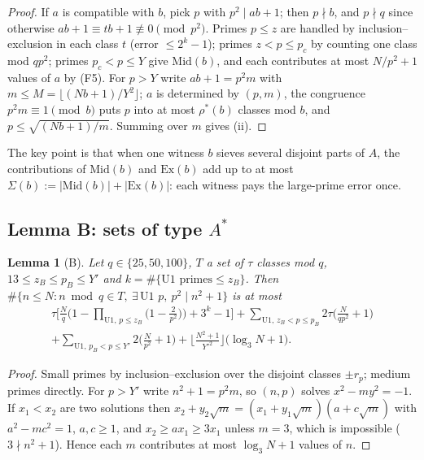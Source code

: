 \documentclass[11pt]{amsart}
\newtheorem{lemma}[theorem]{Lemma}
\theoremstyle{definition}
\theoremstyle{remark}
\newcommand{\Mid}{\mathrm{Mid}}
\newcommand{\Ex}{\mathrm{Ex}}
\begin{document}
\begin{proof}
If $a$ is compatible with $b$, pick $p$ with $p^2\mid ab+1$; then $p\nmid b$, and
$p\nmid q$ since otherwise $ab+1\equiv tb+1\not\equiv0\pmod{p^2}$. Primes $p\le z$
are handled by inclusion--exclusion in each class $t$ (error $\le2^k-1$); primes
$z<p\le p_c$ by counting one class mod $qp^2$; primes $p_c<p\le Y$ give $\Mid(b)$,
and each contributes at most $N/p^2+1$ values of $a$ by (F5). For $p>Y$ write
$ab+1=p^2m$ with $m\le M=\lfloor(Nb+1)/Y^2\rfloor$; $a$ is determined by $(p,m)$,
the congruence $p^2m\equiv1\pmod b$ puts $p$ into at most $\rho^*(b)$ classes mod
$b$, and $p\le\sqrt{(Nb+1)/m}$. Summing over $m$ gives (ii).
\end{proof}

The key point is that when one witness $b$ sieves several disjoint parts of $A$,
the contributions of $\Mid(b)$ and $\Ex(b)$ add up to at most
$\Sigma(b):=|\Mid(b)|+|\Ex(b)|$: each witness pays the large-prime error once.

\subsection{Lemma B: sets of type $A^*$}
\begin{lemma}[B]\label{lem:B}
Let $q\in\{25,50,100\}$, $T$ a set of $\tau$ classes mod $q$,
$13\le z_B\le p_B\le Y'$ and $k=\#\{\text{U1 primes}\le z_B\}$. Then
$\#\{n\le N: n\bmod q\in T,\ \exists\,\text{U1 }p,\ p^2\mid n^2+1\}$ is at most
\begin{multline*}
\tau\Big[\frac Nq\Big(1-\prod_{\text{U1},\,p\le z_B}\Big(1-\frac2{p^2}\Big)\Big)+3^k-1\Big]
+\sum_{\text{U1},\,z_B<p\le p_B}2\tau\Big(\frac N{qp^2}+1\Big)\\
+\sum_{\text{U1},\,p_B<p\le Y'}2\Big(\frac N{p^2}+1\Big)
+\Big\lfloor\frac{N^2+1}{Y'^2}\Big\rfloor\big(\log_3 N+1\big).
\end{multline*}
\end{lemma}

\begin{proof}
Small primes by inclusion--exclusion over the disjoint classes $\pm r_p$; medium
primes directly. For $p>Y'$ write $n^2+1=p^2m$, so $(n,p)$ solves
$x^2-my^2=-1$. If $x_1<x_2$ are two solutions then
$x_2+y_2\sqrt m=(x_1+y_1\sqrt m)(a+c\sqrt m)$ with $a^2-mc^2=1$, $a,c\ge1$, and
$x_2\ge ax_1\ge3x_1$ unless $m=3$, which is impossible ($3\nmid n^2+1$). Hence each
$m$ contributes at most $\log_3N+1$ values of $n$.
\end{proof}
\end{document}
